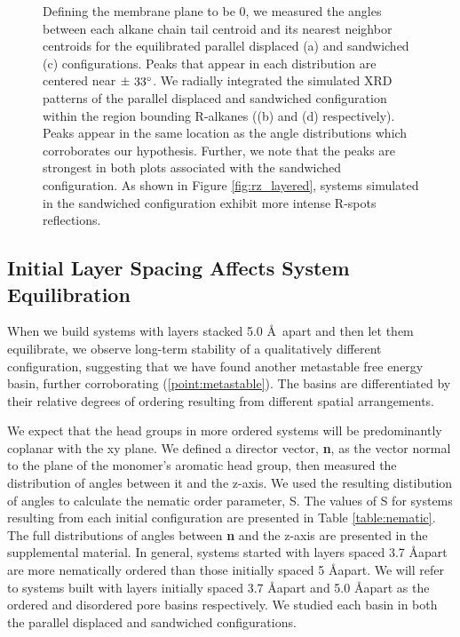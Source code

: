 \documentclass{article}
\newcommand{\angstrom}{\textup{\AA}}
\begin{document}
\begin{figure}[!htb]
{	  Defining the membrane plane to be 0\degree, we
	  measured the angles between each alkane chain tail centroid and its nearest
	  neighbor centroids for the equilibrated parallel displaced (a) and sandwiched
	  (c) configurations. Peaks that appear in each distribution are centered near
	  $\pm~33\degree$. We radially integrated the simulated XRD patterns of the
	  parallel displaced and sandwiched configuration within the region bounding
	  R-alkanes ((b) and (d) respectively).  Peaks appear in the same location as the
	  angle distributions which corroborates our hypothesis. Further, we note that
	  the peaks are strongest in both plots associated with the sandwiched
	  configuration. As shown in Figure \ref{fig:rz_layered}, systems simulated in
	  the sandwiched configuration exhibit more intense R-spots
	  reflections.}~\label{fig:tail_packing}
  \end{figure}

  \subsection{Initial Layer Spacing Affects System Equilibration}

  When we build systems with layers stacked 5.0 \AA~apart and then let them
  equilibrate, we observe long-term stability of a qualitatively different
  configuration, suggesting that we have found another metastable free energy
  basin, further corroborating (\ref{point:metastable}). The basins are
  differentiated by their relative degrees of ordering resulting from different
  spatial arrangements. 

  We expect that the head groups in more ordered systems will be predominantly
  coplanar with the xy plane. We defined a director vector, \textbf{n}, as the
  vector normal to the plane of the monomer's aromatic head group, then measured
  the distribution of angles between it and the z-axis. We used the resulting
  distibution of angles to calculate the nematic order parameter, S. The values
  of S for systems resulting from each initial configuration are presented in
  Table \ref{table:nematic}. The full distributions of angles between \textbf{n}
  and the z-axis are presented in the supplemental material. In general, systems
  started with layers spaced 3.7 \AA apart are more nematically ordered than
  those initially spaced 5 \AA apart. We will refer to systems built with layers
  initially spaced 3.7 \AA apart and 5.0 \AA apart as the ordered and disordered
  pore basins respectively. We studied each basin in both the parallel displaced
  and sandwiched configurations.  
\end{document}
